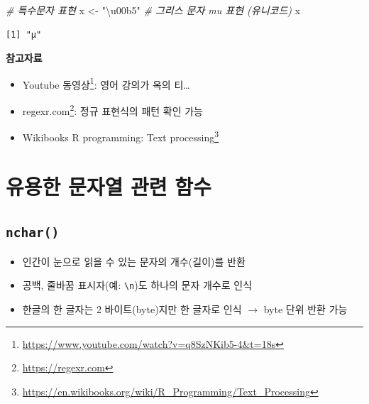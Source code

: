 \documentclass[
  11pt,
]{krantz}
\newenvironment{Shaded}{\begin{snugshade}}{\end{snugshade}}
\newcommand{\CommentTok}[1]{\textcolor[rgb]{0.37,0.37,0.37}{\textit{#1}}}
\newcommand{\NormalTok}[1]{#1}
\newcommand{\StringTok}[1]{\textcolor[rgb]{0.5,0.5,0.5}{#1}}
\providecommand{\tightlist}{%
  \setlength{\itemsep}{0pt}\setlength{\parskip}{0pt}}
\renewcommand{\href}[2]{#2\footnote{\url{#1}}}
\let\BeginKnitrBlock\begin \let\EndKnitrBlock\end
\begin{document}
\begin{Shaded}
\begin{Highlighting}[]
\CommentTok{# 특수문자 표현}
\NormalTok{x <-}\StringTok{ "\textbackslash{}u00b5"} \CommentTok{# 그리스 문자 mu 표현 (유니코드)}
\NormalTok{x}
\end{Highlighting}
\end{Shaded}

\begin{verbatim}
[1] "μ"
\end{verbatim}

\normalsize

\footnotesize

\BeginKnitrBlock{rmdtip}
\textbf{참고자료}

\begin{itemize}
\tightlist
\item
  \href{https://www.youtube.com/watch?v=q8SzNKib5-4\&t=18s}{Youtube 동영상}: 영어 강의가 옥의 티\ldots{}
\item
  \href{https://regexr.com}{regexr.com}: 정규 표현식의 패턴 확인 가능
\item
  \href{https://en.wikibooks.org/wiki/R_Programming/Text_Processing}{Wikibooks R programming: Text processing}
\end{itemize}
\EndKnitrBlock{rmdtip}

\normalsize

\hypertarget{uxc720uxc6a9uxd55c-uxbb38uxc790uxc5f4-uxad00uxb828-uxd568uxc218}{%
\section{유용한 문자열 관련 함수}\label{uxc720uxc6a9uxd55c-uxbb38uxc790uxc5f4-uxad00uxb828-uxd568uxc218}}

\hypertarget{nchar}{%
\subsection{\texorpdfstring{\textbf{\texttt{nchar()}}}{nchar()}}\label{nchar}}

\begin{itemize}
\tightlist
\item
  인간이 눈으로 읽을 수 있는 문자의 개수(길이)를 반환
\item
  공백, 줄바꿈 표시자(예: \texttt{\textbackslash{}n})도 하나의 문자 개수로 인식
\item
  한글의 한 글자는 2 바이트(byte)지만 한 글자로 인식 \(\rightarrow\) byte 단위 반환 가능
\end{itemize}
\end{document}
